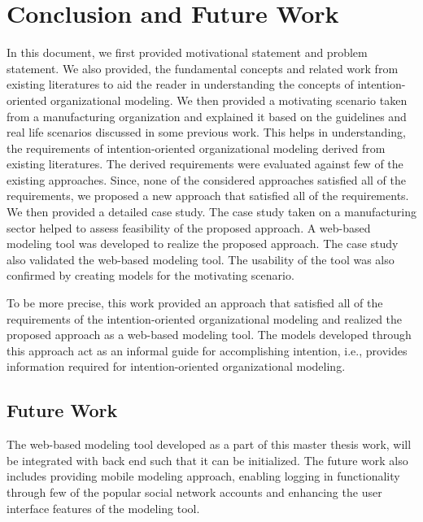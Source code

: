 \chapter{Conclusion and Future Work}
\label{chap:conclusion}

In this document, we first provided motivational statement and problem statement. We also provided, the fundamental concepts and related work from existing literatures to aid the reader in understanding the concepts of intention-oriented organizational modeling. We then provided a motivating scenario taken from a manufacturing organization and explained it based on the guidelines and real life scenarios discussed in some previous work. This helps in understanding, the requirements of intention-oriented organizational modeling derived from existing literatures. The derived requirements were evaluated against few of the existing approaches. Since, none of the considered approaches satisfied all of the requirements, we proposed a new approach that satisfied all of the requirements. We then provided a detailed case study. The case study taken on a manufacturing sector helped to assess feasibility of the proposed approach. A web-based modeling tool was developed to realize the proposed approach. The case study also validated the web-based modeling tool. The usability of the tool was also confirmed by creating models for the motivating scenario.  

To be more precise, this work provided an approach that satisfied all of the requirements of the intention-oriented organizational modeling and realized the proposed approach as a web-based modeling tool. The models developed through this approach act as an informal guide for accomplishing intention, i.e., provides information required for intention-oriented organizational modeling. 

\section*{Future Work}
\label{sec:futurework}
The web-based modeling tool developed as a part of this master thesis work, will be integrated with back end such that it can be initialized. The future work also includes providing mobile modeling approach, enabling logging in functionality through few of the popular social network accounts and enhancing the user interface features of the modeling tool. 





